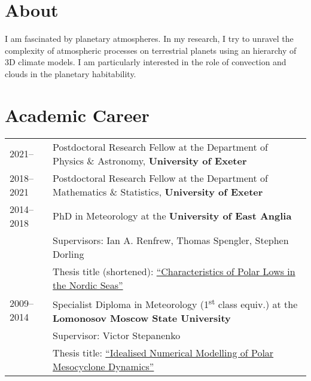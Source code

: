 \documentclass[a4paper, 11pt]{article}
\begin{document}
\thispagestyle{empty}

\keepXColumns



\section{About}
I am fascinated by planetary atmospheres.
In my research, I try to unravel the complexity of atmospheric processes on terrestrial planets using an hierarchy of 3D climate models.
I am particularly interested in the role of convection and clouds in the planetary habitability.

\section{Academic Career}
\begin{tabularx}{\linewidth}{@{}l X@{}}
2021--     & Postdoctoral Research Fellow at the Department of Physics \& Astronomy, \textbf{University of Exeter} \\
2018--2021 & Postdoctoral Research Fellow at the Department of Mathematics \& Statistics, \textbf{University of Exeter} \\
2014--2018 & PhD in Meteorology at the \textbf{University of East Anglia} \\
& Supervisors: Ian A. Renfrew, Thomas Spengler, Stephen Dorling \\
& Thesis title (shortened): \href{https://ueaeprints.uea.ac.uk/id/eprint/68204/}{``Characteristics of Polar Lows in the Nordic Seas''} \\ %
2009--2014 & Specialist Diploma in Meteorology (1\textsuperscript{st} class equiv.) at the \textbf{Lomonosov Moscow State University}  \\
& Supervisor: Victor Stepanenko \\
& Thesis title: \href{https://figshare.com/articles/thesis/SergeevDE_diploma_pdf/5326846/1}{``Idealised Numerical Modelling of Polar Mesocyclone Dynamics''}\\
\end{tabularx}
\end{document}
